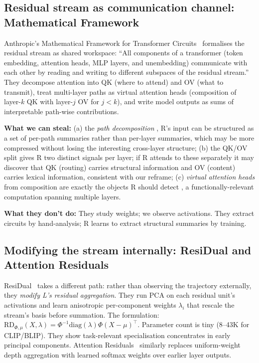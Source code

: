 \documentclass[10pt, twocolumn, a4paper]{article}
\begin{document}
\subsection*{Residual stream as communication channel: Mathematical Framework}

Anthropic's Mathematical Framework for Transformer Circuits~\cite{elhage2021framework} formalises the residual stream as shared workspace: ``All components of a transformer (token embedding, attention heads, MLP layers, and unembedding) communicate with each other by reading and writing to different subspaces of the residual stream.'' They decompose attention into QK (where to attend) and OV (what to transmit), treat multi-layer paths as virtual attention heads (composition of layer-$k$ QK with layer-$j$ OV for $j < k$), and write model outputs as sums of interpretable path-wise contributions.

\textbf{What we can steal:} (a) the \emph{path decomposition} ,  R's input can be structured as a set of per-path summaries rather than per-layer summaries, which may be more compressed without losing the interesting cross-layer structure; (b) the QK/OV split gives R two distinct signals per layer; if R attends to these separately it may discover that QK (routing) carries structural information and OV (content) carries lexical information, consistent with our reframe; (c) \emph{virtual attention heads} from composition are exactly the objects R should detect ,  a functionally-relevant computation spanning multiple layers.

\textbf{What they don't do:} They study weights; we observe activations. They extract circuits by hand-analysis; R learns to extract structural summaries by training.

\subsection*{Modifying the stream internally: ResiDual and Attention Residuals}

ResiDual~\cite{residual2024} takes a different path: rather than observing the trajectory externally, they \emph{modify L's residual aggregation}. They run PCA on each residual unit's activations and learn anisotropic per-component weights $\lambda_i$ that rescale the stream's basis before summation. The formulation: $\mathrm{RD}_{\Phi,\mu}(X, \lambda) = \Phi^{-1} \mathrm{diag}(\lambda) \Phi (X - \mu)^\top$. Parameter count is tiny (8--43K for CLIP/BLIP). They show task-relevant specialisation concentrates in early principal components. Attention Residuals~\cite{attn-residuals-2024} similarly replaces uniform-weight depth aggregation with learned softmax weights over earlier layer outputs.
\end{document}
